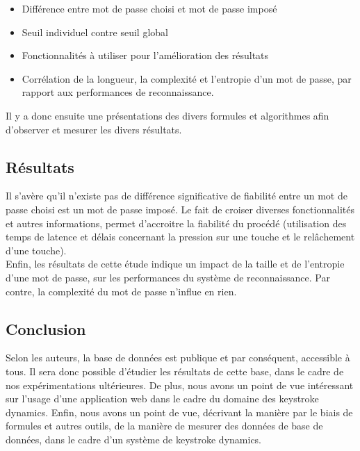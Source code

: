 \begin{itemize}
\item Différence entre mot de passe choisi et mot de passe imposé 
\item Seuil individuel contre seuil global 
\item Fonctionnalités à utiliser pour l'amélioration des résultats
\item Corrélation de la longueur, la complexité et l'entropie d'un mot de passe, par rapport aux performances de reconnaissance.\\
\end{itemize}

Il y a donc ensuite une présentations des divers formules et algorithmes afin d'observer et mesurer les divers résultats.

\subsection{Résultats}

Il s'avère qu'il n'existe pas de différence significative de fiabilité entre un mot de passe choisi est un mot de passe imposé. Le fait de croiser diverses fonctionnalités et autres informations, permet d'accroitre la fiabilité du procédé (utilisation des temps de latence et délais concernant la pression sur une touche et le relâchement d'une touche).\\

Enfin, les résultats de cette étude indique un impact de la taille et de l'entropie d'une mot de passe, sur les performances du système de reconnaissance. Par contre, la complexité du mot de passe n'influe en rien.

\subsection{Conclusion}

Selon les auteurs, la base de données est publique et par conséquent, accessible à tous. Il sera donc possible d'étudier les résultats de cette base, dans le cadre de nos expérimentations ultérieures. De plus, nous avons un point de vue intéressant sur l'usage d'une application web dans le cadre du domaine des keystroke dynamics. Enfin, nous avons un point de vue, décrivant la manière par le biais de formules et autres outils, de la manière de mesurer des données de base de données, dans le cadre d'un système de keystroke dynamics.
